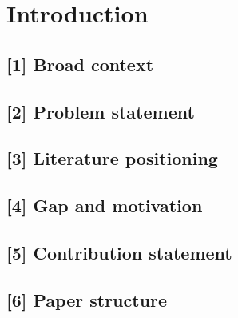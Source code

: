 
\section{Introduction}
\label{sec:introduction}

\subsection*{[1] Broad context}

\subsection*{[2] Problem statement}

\subsection*{[3] Literature positioning}

\subsection*{[4] Gap and motivation}

\subsection*{[5] Contribution statement}

\subsection*{[6] Paper structure}
